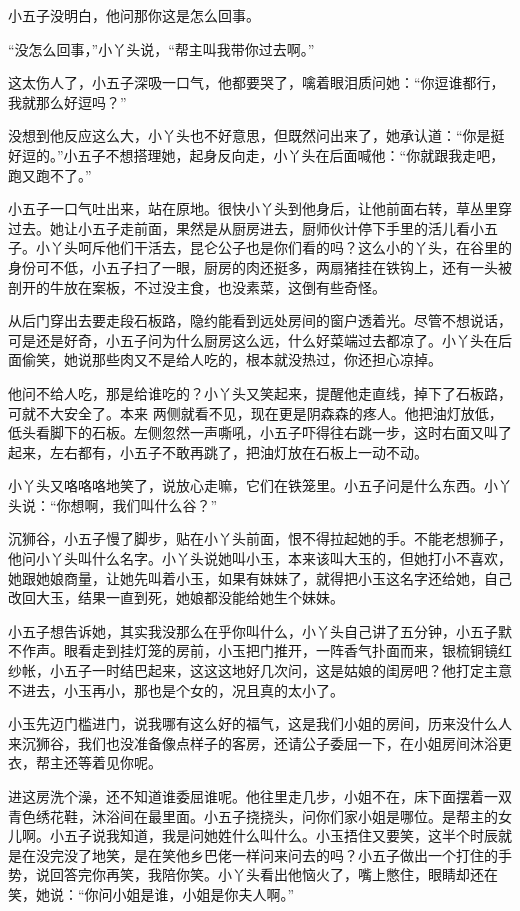 小五子没明白，他问那你这是怎么回事。

“没怎么回事，”小丫头说，“帮主叫我带你过去啊。”

这太伤人了，小五子深吸一口气，他都要哭了，噙着眼泪质问她：“你逗谁都行，我就那么好逗吗？”

没想到他反应这么大，小丫头也不好意思，但既然问出来了，她承认道：“你是挺好逗的。”小五子不想搭理她，起身反向走，小丫头在后面喊他：“你就跟我走吧，跑又跑不了。”

小五子一口气吐出来，站在原地。很快小丫头到他身后，让他前面右转，草丛里穿过去。她让小五子走前面，果然是从厨房进去，厨师伙计停下手里的活儿看小五子。小丫头呵斥他们干活去，昆仑公子也是你们看的吗？这么小的丫头，在谷里的身份可不低，小五子扫了一眼，厨房的肉还挺多，两扇猪挂在铁钩上，还有一头被剖开的牛放在案板，不过没主食，也没素菜，这倒有些奇怪。

从后门穿出去要走段石板路，隐约能看到远处房间的窗户透着光。尽管不想说话，可是还是好奇，小五子问为什么厨房这么远，什么好菜端过去都凉了。小丫头在后面偷笑，她说那些肉又不是给人吃的，根本就没热过，你还担心凉掉。

他问不给人吃，那是给谁吃的？小丫头又笑起来，提醒他走直线，掉下了石板路，可就不大安全了。本来
两侧就看不见，现在更是阴森森的疼人。他把油灯放低，低头看脚下的石板。左侧忽然一声嘶吼，小五子吓得往右跳一步，这时右面又叫了起来，左右都有，小五子不敢再跳了，把油灯放在石板上一动不动。

小丫头又咯咯咯地笑了，说放心走嘛，它们在铁笼里。小五子问是什么东西。小丫头说：“你想啊，我们叫什么谷？”

沉狮谷，小五子慢了脚步，贴在小丫头前面，恨不得拉起她的手。不能老想狮子，他问小丫头叫什么名字。小丫头说她叫小玉，本来该叫大玉的，但她打小不喜欢，她跟她娘商量，让她先叫着小玉，如果有妹妹了，就得把小玉这名字还给她，自己改回大玉，结果一直到死，她娘都没能给她生个妹妹。

小五子想告诉她，其实我没那么在乎你叫什么，小丫头自己讲了五分钟，小五子默不作声。眼看走到挂灯笼的房前，小玉把门推开，一阵香气扑面而来，银梳铜镜红纱帐，小五子一时结巴起来，这这这地好几次问，这是姑娘的闺房吧？他打定主意不进去，小玉再小，那也是个女的，况且真的太小了。

小玉先迈门槛进门，说我哪有这么好的福气，这是我们小姐的房间，历来没什么人来沉狮谷，我们也没准备像点样子的客房，还请公子委屈一下，在小姐房间沐浴更衣，帮主还等着见你呢。

进这房洗个澡，还不知道谁委屈谁呢。他往里走几步，小姐不在，床下面摆着一双青色绣花鞋，沐浴间在最里面。小五子挠挠头，问你们家小姐是哪位。是帮主的女儿啊。小五子说我知道，我是问她姓什么叫什么。小玉捂住又要笑，这半个时辰就是在没完没了地笑，是在笑他乡巴佬一样问来问去的吗？小五子做出一个打住的手势，说回答完你再笑，我陪你笑。小丫头看出他恼火了，嘴上憋住，眼睛却还在笑，她说：“你问小姐是谁，小姐是你夫人啊。”

